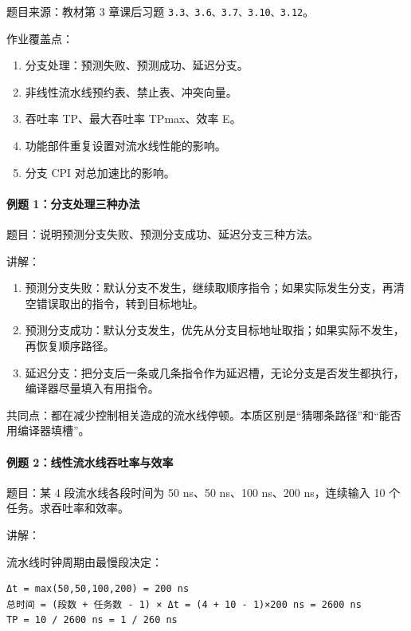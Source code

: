 \documentclass[
]{ctexart}
\newcommand{\passthrough}[1]{#1}
\providecommand{\tightlist}{%
  \setlength{\itemsep}{0pt}\setlength{\parskip}{0pt}}
\begin{document}
题目来源：教材第 3 章课后习题
\passthrough{\lstinline!3.3、3.6、3.7、3.10、3.12!}。

作业覆盖点：

\begin{enumerate}
\def\labelenumi{\arabic{enumi}.}
\tightlist
\item
  分支处理：预测失败、预测成功、延迟分支。
\item
  非线性流水线预约表、禁止表、冲突向量。
\item
  吞吐率 TP、最大吞吐率 TPmax、效率 E。
\item
  功能部件重复设置对流水线性能的影响。
\item
  分支 CPI 对总加速比的影响。
\end{enumerate}

\paragraph{例题
1：分支处理三种办法}\label{ux4f8bux9898-1ux5206ux652fux5904ux7406ux4e09ux79cdux529eux6cd5}

题目：说明预测分支失败、预测分支成功、延迟分支三种方法。

讲解：

\begin{enumerate}
\def\labelenumi{\arabic{enumi}.}
\tightlist
\item
  预测分支失败：默认分支不发生，继续取顺序指令；如果实际发生分支，再清空错误取出的指令，转到目标地址。
\item
  预测分支成功：默认分支发生，优先从分支目标地址取指；如果实际不发生，再恢复顺序路径。
\item
  延迟分支：把分支后一条或几条指令作为延迟槽，无论分支是否发生都执行，编译器尽量填入有用指令。
\end{enumerate}

共同点：都在减少控制相关造成的流水线停顿。本质区别是``猜哪条路径''和``能否用编译器填槽''。

\paragraph{例题
2：线性流水线吞吐率与效率}\label{ux4f8bux9898-2ux7ebfux6027ux6d41ux6c34ux7ebfux541eux5410ux7387ux4e0eux6548ux7387}

题目：某 4 段流水线各段时间为 50 ns、50 ns、100 ns、200 ns，连续输入 10
个任务。求吞吐率和效率。

讲解：

流水线时钟周期由最慢段决定：

\begin{lstlisting}
Δt = max(50,50,100,200) = 200 ns
总时间 = (段数 + 任务数 - 1) × Δt = (4 + 10 - 1)×200 ns = 2600 ns
TP = 10 / 2600 ns = 1 / 260 ns
\end{lstlisting}
\end{document}

